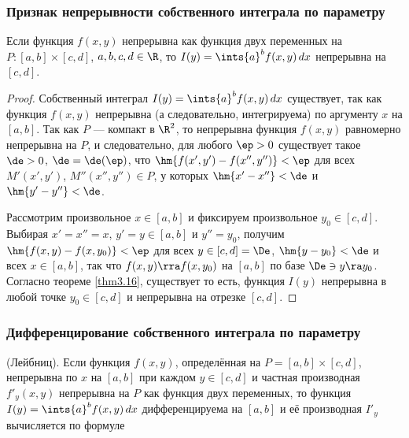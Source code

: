 \documentclass[a4paper]{article}
\begin{document}
\subsubsection{Признак непрерывности собственного интеграла по
параметру}
\begin{theorem}
Если функция $f(x,y)$ непрерывна как функция двух переменных на
$P\colon [a,b]\times[c,d]$, $a,b,c,d\in\R$, то $I(y) = \ints{a}^b
f(x,y)\,dx$ непрерывна на $[c,d]$.
\end{theorem}

\begin{proof}
Собственный интеграл $I(y) = \ints{a}^b f(x,y)\,dx$ существует, так
как функция $f(x,y)$ непрерывна (а следовательно, интегрируема) по
аргументу $x$ на $[a,b]$. Так как $P$ --- компакт в $\R^2$, то
непрерывна функция $f(x,y)$ равномерно непрерывна на $P$, и
следовательно, для любого $\ep>0$ существует такое $\de>0$,
$\de=\de(\ep)$, что $\hm{f(x',y') - f(x'',y'')}<\ep$ для всех
$M'(x',y')$, $M''(x'',y'')\in P$, у которых $\hm{x'-x''}<\de$ и
$\hm{y'-y''}<\de$.

Рассмотрим произвольное $x\in[a,b]$ и фиксируем произвольное
$y_0\in[c,d]$. Выбирая $x'=x''=x$, $y'=y\in[a,b]$ и $y''=y_0$,
получим $\hm{f(x,y)-f(x,y_0)}<\ep$ для всех $y\in[c,d]=\De$,
$\hm{y-y_0}<\de$ и всех $x\in[a,b]$, так что $f(x,y)\rra f(x,y_0)$
на $[a,b]$ по базе $\De\owns y\ra y_0$. Согласно теореме
\ref{thm3.16}, существует  то есть, функция $I(y)$ непрерывна в любой
точке $y_0\in[c,d]$ и непрерывна на отрезке $[c,d]$.
\end{proof}

\subsubsection{Дифференцирование собственного интеграла по
параметру}

\begin{theorem}
(Лейбниц). Если функция $f(x,y)$, определённая на
$P=[a,b]\times[c,d]$, непрерывна по $x$ на $[a,b]$ при каждом
$y\in[c,d]$ и частная производная $f'_y(x,y)$ непрерывна на $P$ как
функция двух переменных, то функция $I(y)=\ints{a}^b f(x,y)\,dx$
дифференцируема на $[a,b]$ и её производная $I'_y$ вычисляется по
формуле 
\end{theorem}
\end{document}
